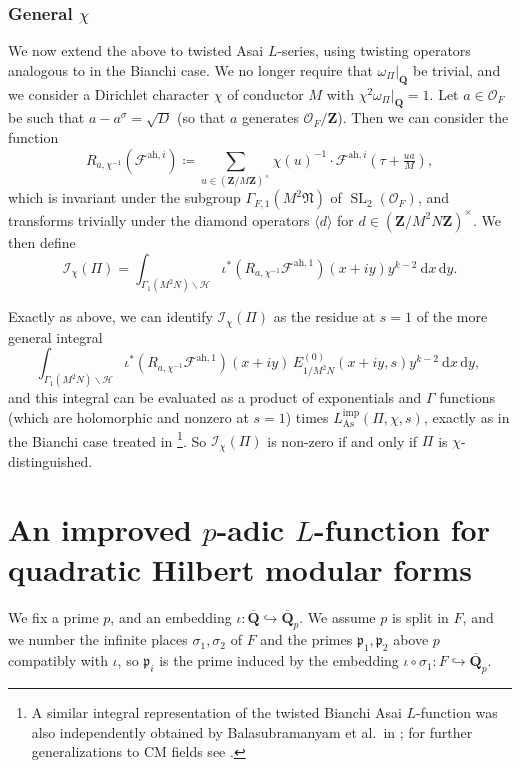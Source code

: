 \documentclass[a4paper,10pt]{amsart}
\theoremstyle{plain}
\theoremstyle{remark}
\newcommand{\ah}{\mathrm{ah}}
\DeclareMathOperator{\SL}{SL}
\DeclareMathOperator{\As}{As}
\newcommand{\QQbar}{\overline{\QQ}}
\newcommand{\QQ}{\mathbf{Q}}
\newcommand{\fN}{\mathfrak{N}}
\newcommand{\ZZ}{\mathbf{Z}}
\newcommand{\cF}{\mathcal{F}}
\newcommand{\cH}{\mathcal{H}}
\newcommand{\cO}{\mathcal{O}}
\newcommand{\into}{\hookrightarrow}
\newcommand{\pp}{\mathfrak{p}}
\numberwithin{equation}{section}
\begin{document}
 \subsubsection*{General $\chi$}

  We now extend the above to twisted Asai $L$-series, using twisting operators analogous to \cite[\S 7]{loefflerwilliams18} in the Bianchi case. We no longer require that $\omega_{\Pi}|_{\QQ}$ be trivial, and we consider a Dirichlet character $\chi$ of conductor $M$ with $\chi^2 \omega_{\Pi}|_{\QQ} = 1$. Let $a \in \cO_F$ be such that $a - a^{\sigma} = \sqrt{D}$ (so that $a$ generates $\cO_F / \ZZ$). Then we can consider the function
  \[
   R_{a, \chi^{-1}}(\cF^{\ah, i}) \coloneqq \sum_{u \in (\ZZ/M \ZZ)^\times} \chi(u)^{-1} \cdot \cF^{\ah, i}(\tau + \tfrac{ua}{M}),
  \]
  which is invariant under the subgroup $\Gamma_{F, 1}(M^2 \fN)$ of $\SL_2(\cO_F)$, and transforms trivially under the diamond operators $\langle d \rangle$ for $d \in (\ZZ / M^2 N \ZZ)^\times$. We then define
  \[
   \mathcal{I}_{\chi}(\Pi) = \int_{\Gamma_1(M^2 N) \backslash \cH} \iota^*\left(R_{a, \chi^{-1}} \cF^{\ah, 1}\right)(x + iy) y^{k - 2}\ \mathrm{d}x\, \mathrm{d}y.
  \]

  Exactly as above, we can identify $\mathcal{I}_{\chi}(\Pi)$ as the residue at $s = 1$ of the more general integral
  \[
   \int_{\Gamma_1(M^2 N) \backslash \cH} \iota^*\left(R_{a, \chi^{-1}} \cF^{\ah, 1}\right)(x + iy)\, E^{(0)}_{1/M^2N}(x + iy, s) y^{k - 2}\ \mathrm{d}x\, \mathrm{d}y, \
  \]
  and this integral can be evaluated as a product of exponentials and $\Gamma$ functions (which are holomorphic and nonzero at $s = 1$) times $L^{\mathrm{imp}}_{\As}(\Pi, \chi, s)$, exactly as in the Bianchi case treated in \cite{loefflerwilliams18}\footnote{A similar integral representation of the twisted Bianchi Asai $L$-function was also independently obtained by Balasubramanyam et al.~in \cite{BGV20}; for further generalizations to CM fields see \cite{namikawa22}.}. So $\mathcal{I}_{\chi}(\Pi)$ is non-zero if and only if $\Pi$ is $\chi$-distinguished.


\section{An improved $p$-adic $L$-function for quadratic Hilbert modular forms}\label{sec:improved}

 We fix a prime $p$, and an embedding $\iota : \QQbar \into \QQbar_p$. We assume $p$ is split in $F$, and we number the infinite places $\sigma_1, \sigma_2$ of $F$ and the primes $\pp_1, \pp_2$ above $p$ compatibly with $\iota$, so $\pp_i$ is the prime induced by the embedding $\iota \circ \sigma_1 : F \into \QQbar_p$.
\end{document}
